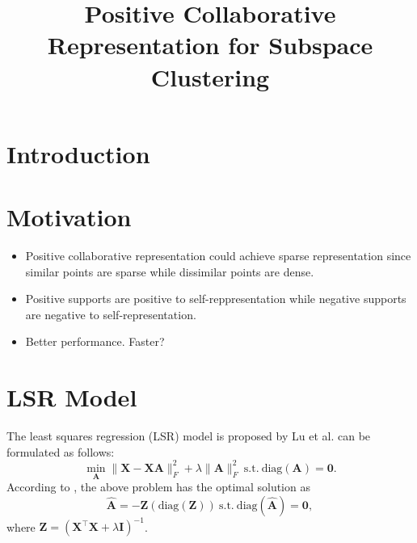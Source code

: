 \documentclass[10pt,twocolumn,letterpaper]{article}
\begin{document}
\title{Positive Collaborative Representation for Subspace Clustering}

\maketitle



\begin{abstract}

\end{abstract}

\section{Introduction}



\section{Motivation}

\begin{itemize}
\item Positive collaborative representation could achieve sparse representation since similar points are sparse while dissimilar points are dense.

\item Positive supports are positive to self-reppresentation while negative supports are negative to self-representation.

\item Better performance. Faster? 
\end{itemize}

\section{LSR Model}
The least squares regression (LSR) model \cite{lsr} is proposed by Lu et al. can be formulated as follows:
\begin{equation}
\label{e1}
\min_{\bm{A}}
\|
\bm{X}
-
\bm{X}\bm{A}
\|_{F}^{2}
+
\lambda
\|
\bm{A}
\|_{F}^{2}
\ 
\text{s.t.}
\ 
\text{diag}(\bm{A})=\bm{0}.
\end{equation}
According to \cite{lsr}, the above problem has the optimal solution as 
\begin{equation}
\label{e2}
\hat{\bm{A}}
=
-\bm{\bm{Z}}(\text{diag}(\bm{Z}))
\
\text{s.t.} 
\
\text{diag}(\hat{\bm{A}})=\bm{0}
,
\end{equation}
where $\bm{Z}=(\bm{X}^{\top}\bm{X}+\lambda\bm{I})^{-1}$.
\end{document}
